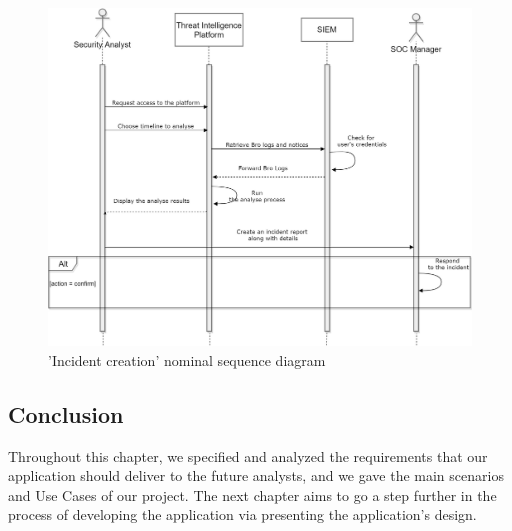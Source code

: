 \begin{figure}[htbp!]
\begin{center}
\includegraphics[height=5.0 in]{images/ATHENAThreatintel.jpg}
\caption{’Incident creation’ nominal sequence diagram}
\label{seq_diag2}
\end{center}
\end{figure} 


\subsection *{Conclusion}

Throughout this chapter, we specified and analyzed the requirements that our application should deliver to the future analysts, and we gave the main scenarios and Use Cases of our project. The next chapter aims to go a step further in the process of developing the application via presenting the application’s design.


